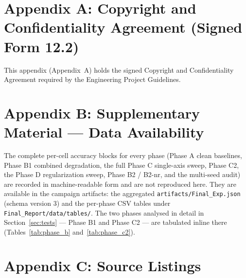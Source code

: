 
\section*{Appendix A: Copyright and Confidentiality Agreement (Signed Form 12.2)}
\label{app:copyright}

This appendix (Appendix~A) holds the signed Copyright and Confidentiality
Agreement required by the Engineering Project Guidelines.

\begin{center}
\end{center}

\section*{Appendix B: Supplementary Material --- Data Availability}
\label{app:tables}

The complete per-cell accuracy blocks for every phase (Phase A clean baselines,
Phase B1 combined degradation, the full Phase C single-axis sweep, Phase C2,
the Phase D regularization sweep, Phase B2 / B2-nr, and the multi-seed audit)
are recorded in machine-readable form and are not reproduced here. They are
available in the campaign artifacts: the aggregated
\texttt{artifacts/Final\_Exp.json} (schema version 3) and the per-phase CSV
tables under \texttt{Final\_Report/data/tables/}. The two phases analysed in
detail in Section~\ref{sec:tests} --- Phase B1 and Phase C2 --- are tabulated
inline there (Tables~\ref{tab:phase_b} and~\ref{tab:phase_c2}).

\section*{Appendix C: Source Listings}
\label{app:listings}

